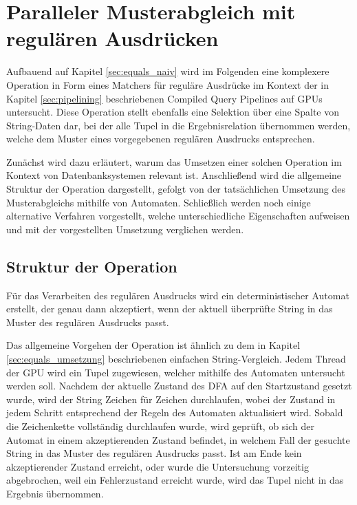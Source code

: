 \chapter{Paralleler Musterabgleich mit regulären Ausdrücken}
\label{sec:regex_naiv}

Aufbauend auf Kapitel \ref{sec:equals_naiv} wird im Folgenden eine komplexere Operation in Form eines Matchers für reguläre Ausdrücke im Kontext der in Kapitel \ref{sec:pipelining} beschriebenen Compiled Query Pipelines auf GPUs untersucht.
Diese Operation stellt ebenfalls eine Selektion über eine Spalte von String-Daten dar, bei der alle Tupel in die Ergebnisrelation übernommen werden, welche dem Muster eines vorgegebenen regulären Ausdrucks entsprechen.

Zunächst wird dazu erläutert, warum das Umsetzen einer solchen Operation im Kontext von Datenbanksystemen relevant ist.
Anschließend wird die allgemeine Struktur der Operation dargestellt, gefolgt von der tatsächlichen Umsetzung des Musterabgleichs mithilfe von Automaten.
Schließlich werden noch einige alternative Verfahren vorgestellt, welche unterschiedliche Eigenschaften aufweisen und mit der vorgestellten Umsetzung verglichen werden.

\section{Struktur der Operation}

Für das Verarbeiten des regulären Ausdrucks wird ein deterministischer Automat erstellt, der genau dann akzeptiert, wenn der aktuell überprüfte String in das Muster des regulären Ausdrucks passt.

Das allgemeine Vorgehen der Operation ist ähnlich zu dem in Kapitel \ref{sec:equals_umsetzung} beschriebenen einfachen String-Vergleich.
Jedem Thread der GPU wird ein Tupel zugewiesen, welcher mithilfe des Automaten untersucht werden soll.
Nachdem der aktuelle Zustand des DFA auf den Startzustand gesetzt wurde, wird der String Zeichen für Zeichen durchlaufen, wobei der Zustand in jedem Schritt entsprechend der Regeln des Automaten aktualisiert wird.
Sobald die Zeichenkette vollständig durchlaufen wurde, wird geprüft, ob sich der Automat in einem akzeptierenden Zustand befindet, in welchem Fall der gesuchte String in das Muster des regulären Ausdrucks passt.
Ist am Ende kein akzeptierender Zustand erreicht, oder wurde die Untersuchung vorzeitig abgebrochen, weil ein Fehlerzustand erreicht wurde, wird das Tupel nicht in das Ergebnis übernommen.

